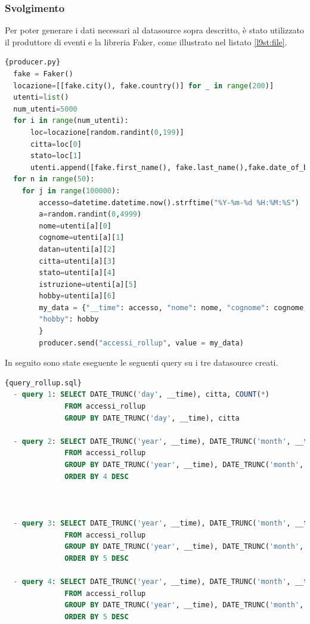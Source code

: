 \subsubsection{Svolgimento}
Per poter generare i dati necessari al \gls{datasource}{} sopra descritto, 
è stato utilizzato il produttore di eventi e la libreria \gls{Faker}{}, come illustrato nel listato \ref{l9st:file}.
\begin{lstlisting}[language=Python, caption=\texttt{producer\_rollup.py}, label=l9st:file]{producer.py}
  fake = Faker()
  locazione=[[fake.city(), fake.country()] for _ in range(200)]
  utenti=list()
  num_utenti=5000
  for i in range(num_utenti):
      loc=locazione[random.randint(0,199)]
      citta=loc[0]
      stato=loc[1]
      utenti.append([fake.first_name(), fake.last_name(),fake.date_of_birth(minimum_age=18, maximum_age=89).strftime("%Y-%m-%d"), citta, stato, fake.random_element(elements=("Scuola Secondaria", "Laurea triennale", "Laurea Magistrale", "Dottorato")), fake.random_element(elements=("Leggere","Viaggiare","Giocare a calcio","Giocare ai videogiochi","Fare sport")) ] )
  for n in range(50):
    for j in range(100000):
        accesso=datetime.datetime.now().strftime("%Y-%m-%d %H:%M:%S")
        a=random.randint(0,4999)
        nome=utenti[a][0]
        cognome=utenti[a][1]
        datan=utenti[a][2]
        citta=utenti[a][3]
        stato=utenti[a][4]
        istruzione=utenti[a][5]
        hobby=utenti[a][6]
        my_data = {"__time": accesso, "nome": nome, "cognome": cognome, "datan":  datan, "citta": citta, "stato": stato, "istruzione": istruzione,
        "hobby": hobby
        }
        producer.send("accessi_rollup", value = my_data) 
    \end{lstlisting}
In seguito sono state eseguente le seguenti query su i tre \gls{datasource}{} creati.
\begin{lstlisting}[language=SQL, caption=\texttt{query\_rollup.sql}, label=lst:file]{query_rollup.sql}
  - query 1: SELECT DATE_TRUNC('day', __time), citta, COUNT(*)
              FROM accessi_rollup
              GROUP BY DATE_TRUNC('day', __time), citta
              
  - query 2: SELECT DATE_TRUNC('year', __time), DATE_TRUNC('month', __time), stato, COUNT(*)
              FROM accessi_rollup
              GROUP BY DATE_TRUNC('year', __time), DATE_TRUNC('month', __time), stato
              ORDER BY 4 DESC
  


  - query 3: SELECT DATE_TRUNC('year', __time), DATE_TRUNC('month', __time), DATE_TRUNC('day', __time), stato, citta, COUNT(*) 
              FROM accessi_rollup
              GROUP BY DATE_TRUNC('year', __time), DATE_TRUNC('month', __time), DATE_TRUNC('day', __time), stato, citta
              ORDER BY 5 DESC
  
  - query 4: SELECT DATE_TRUNC('year', __time), DATE_TRUNC('month', __time), DATE_TRUNC('day', __time), DATE_TRUNC('hour', __time), stato, citta, COUNT(*) 
              FROM accessi_rollup
              GROUP BY DATE_TRUNC('year', __time), DATE_TRUNC('month', __time), DATE_TRUNC('day', __time), DATE_TRUNC('hour', __time), stato, citta
              ORDER BY 5 DESC
  \end{lstlisting}
